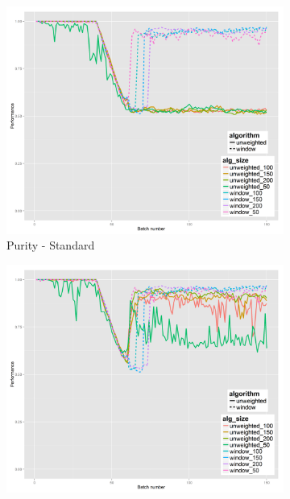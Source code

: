 \begin{figure}[!h]
        \centering
        \begin{subfigure}[b]{0.47\textwidth}
          \includegraphics[width=\textwidth]{standard_alt/ci_evolving_pen_48_49_standard_purity.png}         
                 \caption{Purity - Standard}
                 \label{fig:ps_4849}
        \end{subfigure}
        \begin{subfigure}[b]{0.47\textwidth}
                 \includegraphics[width=\textwidth]{standard_alt/ci_evolving_pen_48_49_alternative_purity.png}

\end{subfigure}
\end{figure}

